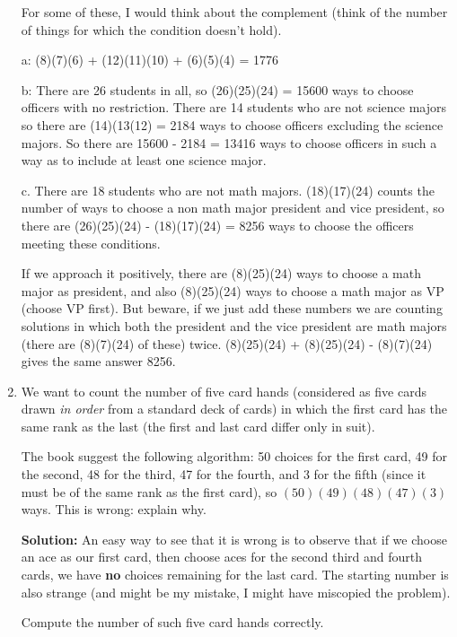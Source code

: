 \documentclass[12pt]{article}
\begin{document}
\begin{enumerate}
\begin{enumerate}
\end{enumerate}

For some of these, I would think about the complement (think of the number of things for which the condition doesn't hold).

a:  (8)(7)(6) + (12)(11)(10) + (6)(5)(4) = 1776

b:  There are 26 students in all, so (26)(25)(24) = 15600 ways to choose officers with no restriction.  There are 14 students who are not science majors so there are (14)(13(12) = 2184 ways to choose officers excluding the science majors.
So there are 15600 - 2184 = 13416 ways to choose officers in such a way as to include at least one science major.

c.  There are 18 students who are not math majors.  (18)(17)(24) counts the number of ways to choose a non math major president and vice president, so there are (26)(25)(24) - (18)(17)(24) = 8256 ways to choose the officers meeting these conditions.  

If we approach it positively, there are (8)(25)(24) ways to choose a math major as president, and also
(8)(25)(24) ways to choose a math major as VP (choose VP first).  But beware, if we just add these numbers
we are counting solutions in which both the president and the vice president are math majors (there are (8)(7)(24) of these) twice.  (8)(25)(24) + (8)(25)(24) - (8)(7)(24) gives the same answer 8256.

\newpage

\item  We want to count the number of five card hands (considered as five cards drawn {\em in order\/} from a standard deck of cards) in which the first card has the same rank as the last (the first and last card differ only in suit).

The book suggest the following algorithm:  50 choices for the first card, 49 for the second, 48 for the third, 47 for the fourth,
and 3 for the fifth (since it must be of the same rank as the first card), so $(50)(49)(48)(47)(3)$ ways.  This is wrong:
explain why.

{\bf Solution:}  An easy way to see that it is wrong is to observe that if we choose an ace as our first card, then choose aces for the second third and fourth cards, we have {\bf no} choices remaining for the last card.  The starting number is also strange (and might be my mistake, I might have miscopied the problem).

Compute the number of such five card hands correctly.


\end{enumerate}
\end{document}
